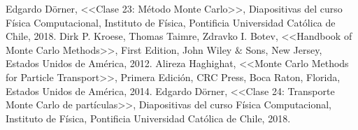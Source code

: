 

\begin{thebibliography}{0}
 Edgardo Dörner, <<Clase 23: Método Monte Carlo>>, Diapositivas del curso Física Computacional, Instituto de Física, Pontificia Universidad Católica de Chile, 2018.
 Dirk P. Kroese, Thomas Taimre, Zdravko I. Botev, <<Handbook of Monte Carlo Methods>>, First Edition, John Wiley $\&$ Sons, New Jersey, Estados Unidos de América, 2012.
 Alireza Haghighat, <<Monte Carlo Methods for Particle Transport>>, Primera Edición, CRC Press, Boca Raton, Florida, Estados Unidos de América, 2014.
 Edgardo Dörner, <<Clase 24: Transporte Monte Carlo de partículas>>, Diapositivas del curso Física Computacional, Instituto de Física, Pontificia Universidad Católica de Chile, 2018.

\end{thebibliography}
